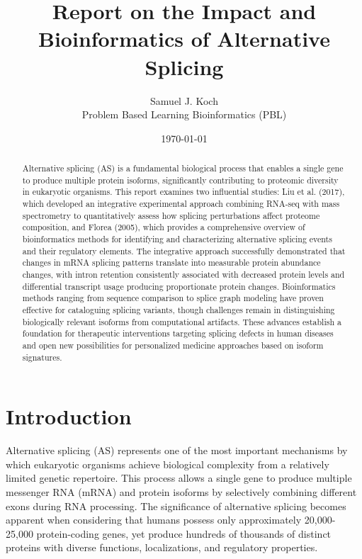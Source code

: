 \documentclass[12pt,a4paper]{article}
\title{Report on the Impact and Bioinformatics of Alternative Splicing}
\author{Samuel J. Koch \\
        Problem Based Learning Bioinformatics (PBL)}
\date{\today}
\begin{document}
\maketitle

\doublespacing

\begin{abstract}
Alternative splicing (AS) is a fundamental biological process that enables a single gene to produce multiple protein isoforms, significantly contributing to proteomic diversity in eukaryotic organisms. This report examines two influential studies: Liu et al. (2017), which developed an integrative experimental approach combining RNA-seq with mass spectrometry to quantitatively assess how splicing perturbations affect proteome composition, and Florea (2005), which provides a comprehensive overview of bioinformatics methods for identifying and characterizing alternative splicing events and their regulatory elements. The integrative approach successfully demonstrated that changes in mRNA splicing patterns translate into measurable protein abundance changes, with intron retention consistently associated with decreased protein levels and differential transcript usage producing proportionate protein changes. Bioinformatics methods ranging from sequence comparison to splice graph modeling have proven effective for cataloguing splicing variants, though challenges remain in distinguishing biologically relevant isoforms from computational artifacts. These advances establish a foundation for therapeutic interventions targeting splicing defects in human diseases and open new possibilities for personalized medicine approaches based on isoform signatures.
\end{abstract}

\section{Introduction}

Alternative splicing (AS) represents one of the most important mechanisms by which eukaryotic organisms achieve biological complexity from a relatively limited genetic repertoire. This process allows a single gene to produce multiple messenger RNA (mRNA) and protein isoforms by selectively combining different exons during RNA processing. The significance of alternative splicing becomes apparent when considering that humans possess only approximately 20,000-25,000 protein-coding genes, yet produce hundreds of thousands of distinct proteins with diverse functions, localizations, and regulatory properties.
\end{document}
